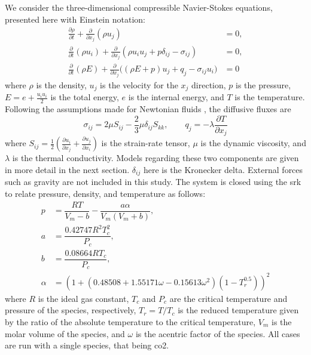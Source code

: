 We consider the three-dimensional compressible Navier-Stokes equations, presented here with Einstein notation:
\begin{subequations} \label{NSE_einstein}
\begin{align}
  \frac{\partial\rho}{\partial t} + \frac{\partial }{\partial x_j} \left( \rho u_j \right) &= 0,  \label{NSE_mass}\\
  \frac{\partial}{\partial t} \left( \rho u_i \right) + \frac{\partial}{\partial x_j} \left(\rho u_i u_j + p \delta_{ij} -\sigma_{ij} \right) &= 0,  \label{NSE_mom}\\
  \frac{\partial}{\partial t} \left( \rho E \right) + \frac{\partial}{\partial x_j} \big(\left( \rho E+p \right) u_j + q_j - \sigma_{ij} u_i\big) &= 0 \label{NSE_E}
\end{align}
\end{subequations}
where $\rho$ is the density, $u_j$ is the velocity for the $x_j$ direction, $p$ is the pressure, $E = e + \frac{u_i u_i}{2}$ is the total energy, $e $ is the internal energy, and $T$ is the temperature. Following the assumptions made for Newtonian fluids \cite{}, the diffusive fluxes are
\begin{equation} \label{Transport}
  \sigma_{ij} = 2\mu S_{ij} - \frac{2}{3}\mu \delta_{ij} S_{kk}, \quad \quad
  q_j = -\lambda \frac{\partial T}{\partial x_j}
\end{equation}
where
$S_{ij} = \frac{1}{2}\left(\frac{\partial u_i}{\partial x_j} + \frac{\partial u_j}{\partial x_i} \right)$ is the strain-rate tensor, $\mu$ is the dynamic viscosity, and $\lambda$ is the thermal conductivity. Models regarding these two components are given in more detail in the next section. $\delta_{ij}$ here is the Kronecker delta. External forces such as gravity are not included in this study. The system is closed using the \gls{srk} \cite{SOAVE1972} to relate pressure, density, and temperature as follows:
\begin{equation} \label{SRK_eos}
\begin{aligned} 
	p &= \dfrac{RT}{V_m - b} - \dfrac{a \alpha}{V_m(V_m + b)}, \\
	a &= \dfrac{0.42747R^2T_c^2}{P_c}, \\
	b &= \dfrac{0.08664RT_c}{P_c}, \\
	\alpha &= \left( 1 + \left( 0.48508 + 1.55171 \omega - 0.15613 \omega^2 \right)\left( 1 - T_r^{0.5} \right) \right)^2
\end{aligned}
\end{equation}
where $R$ is the ideal gas constant, $T_c$ and $P_c$ are the critical temperature and pressure of the species, respectively, $T_r = T/T_c$ is the reduced temperature given by the ratio of the absolute temperature to the critical temperature, $V_m$ is the molar volume of the species, and $\omega$ is the acentric factor of the species. All cases are run with a single species, that being \gls{co2}. 

